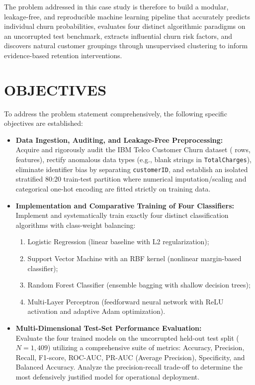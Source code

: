 The problem addressed in this case study is therefore to build a modular, leakage-free, and reproducible machine learning pipeline that accurately predicts individual churn probabilities, evaluates four distinct algorithmic paradigms on an uncorrupted test benchmark, extracts influential churn risk factors, and discovers natural customer groupings through unsupervised clustering to inform evidence-based retention interventions.

\section{OBJECTIVES}
To address the problem statement comprehensively, the following specific objectives are established:

\begin{itemize}
    \item[\textbf{Objective 1:}] \textbf{Data Ingestion, Auditing, and Leakage-Free Preprocessing:}\\
    Acquire and rigorously audit the IBM Telco Customer Churn dataset (\datasetTotalRows{} rows, \datasetTotalCols{} features), rectify anomalous data types (e.g., blank strings in \texttt{TotalCharges}), eliminate identifier bias by separating \texttt{customerID}, and establish an isolated stratified 80:20 train-test partition where numerical imputation/scaling and categorical one-hot encoding are fitted strictly on training data.

    \item[\textbf{Objective 2:}] \textbf{Implementation and Comparative Training of Four Classifiers:}\\
    Implement and systematically train exactly four distinct classification algorithms with class-weight balancing:
    \begin{enumerate}
        \item Logistic Regression (linear baseline with L2 regularization);
        \item Support Vector Machine with an RBF kernel (nonlinear margin-based classifier);
        \item Random Forest Classifier (ensemble bagging with shallow decision trees);
        \item Multi-Layer Perceptron (feedforward neural network with ReLU activation and adaptive Adam optimization).
    \end{enumerate}

    \item[\textbf{Objective 3:}] \textbf{Multi-Dimensional Test-Set Performance Evaluation:}\\
    Evaluate the four trained models on the uncorrupted held-out test split ($N=1,409$) utilizing a comprehensive suite of metrics: Accuracy, Precision, Recall, F1-score, ROC-AUC, PR-AUC (Average Precision), Specificity, and Balanced Accuracy. Analyze the precision-recall trade-off to determine the most defensively justified model for operational deployment.


\end{itemize}
